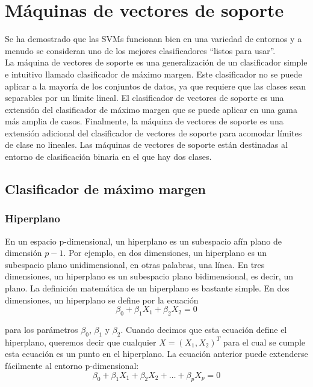 \chapter{Máquinas de vectores de soporte}\label{Chapter8} 

Se ha demostrado que las SVMs funcionan bien en una variedad de entornos y a menudo se consideran uno de los mejores clasificadores ``listos para usar''. \\

La máquina de vectores de soporte es una generalización de un clasificador simple e intuitivo llamado clasificador de máximo margen. Este clasificador no se puede aplicar a la mayoría de los conjuntos de datos, ya que requiere que las clases sean separables por un límite lineal. El clasificador de vectores de soporte es una extensión del clasificador de máximo margen que se puede aplicar en una gama más amplia de casos. Finalmente, la máquina de vectores de soporte es una extensión adicional del clasificador de vectores de soporte para acomodar límites de clase no lineales. Las máquinas de vectores de soporte están destinadas al entorno de clasificación binaria en el que hay dos clases. 

\section{Clasificador de máximo margen}

\subsection{Hiperplano}

En un espacio p-dimensional, un hiperplano es un subespacio afín plano de dimensión $p - 1$. Por ejemplo, en dos dimensiones, un hiperplano es un subespacio plano unidimensional, en otras palabras, una línea. En tres dimensiones, un hiperplano es un subespacio plano bidimensional, es decir, un plano. La definición matemática de un hiperplano es bastante simple. En dos dimensiones, un hiperplano se define por la ecuación
\begin{equation}
\beta_0 + \beta_1 X_1 + \beta_2 X_2 = 0
\label{eq:9.1}
\end{equation}

\noindent para los parámetros $\beta_0$, $\beta_1$ y $\beta_2$. Cuando decimos que esta ecuación define el hiperplano, queremos decir que cualquier $X = (X_1, X_2)^T$ para el cual se cumple esta ecuación es un punto en el hiperplano. La ecuación anterior puede extenderse fácilmente al entorno p-dimensional:
\begin{equation}
\beta_0 + \beta_1 X_1 + \beta_2 X_2 + \ldots + \beta_p X_p = 0
\label{eq:9.2}
\end{equation}

